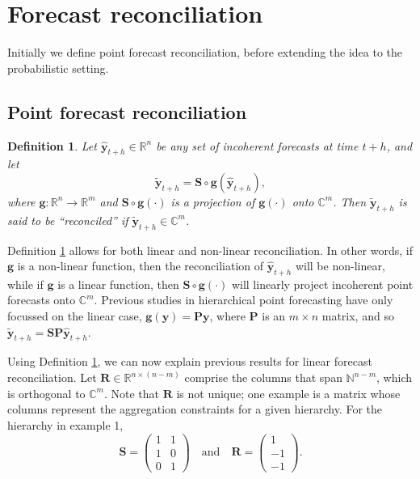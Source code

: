 \documentclass[a4paper, 11pt]{article}
\newtheorem{definition}{Definition}[section]
\begin{document}
\section{Forecast reconciliation}\label{sec:reconciliation}

Initially we define point forecast reconciliation, before extending the idea to the probabilistic setting.

\subsection{Point forecast reconciliation}


\begin{definition}\label{def:reconpoint}
  Let $\hat{\bm{y}}_{t+h} \in \mathbb{R}^n$ be any set of incoherent forecasts at time $t+h$, and let 
  \begin{equation}
    \tilde{\bm{y}}_{t+h}=\bm{S} \circ \bm{g}(\hat{\bm{y}}_{t+h}),
  \end{equation} 
  where $\bm{g}:\mathbb{R}^n \rightarrow \mathbb{R}^m$ and $\bm{S}\circ \bm{g}(\cdot)$ is a projection of $\bm{g}(\cdot)$ onto $\mathbb{C}^m$. Then $\tilde{\bm{y}}_{t+h}$ is said to be ``reconciled'' if  $\tilde{\bm{y}}_{t+h} \in \mathbb{C}^m$.
\end{definition}

Definition \ref{def:reconpoint} allows for both linear and non-linear reconciliation. In other words, if $\bm{g}$ is a non-linear function, then the reconciliation of $\hat{\bm{y}}_{t+h}$ will be non-linear, while if $\bm{g}$ is a linear function, then $\bm{S}\circ \bm{g}(\cdot)$ will linearly project incoherent point forecasts onto $\mathbb{C}^m$. Previous studies in hierarchical point forecasting have only focussed on the linear case, $\bm{g}(\bm{y}) = \bm{P}\bm{y}$, where $\bm{P}$ is an $m \times n$ matrix, and so $\tilde{\bm{y}}_{t+h}=\bm{S}\bm{P} \hat{\bm{y}}_{t+h}$. 

Using Definition \ref{def:reconpoint}, we can now explain previous results for linear forecast reconciliation. Let $\bm{R} \in \mathbb{R}^{n \times (n-m)}$ comprise the columns that span $\bm{\mathbb{N}}^{n-m}$, which is orthogonal to $\mathbb{C}^m$. Note that $\bm{R}$ is not unique; one example is a matrix whose columns represent the aggregation constraints for a given hierarchy. For the hierarchy in example 1, 
$$ 
\bm{S} = 
\begin{pmatrix} 
1& 1 \\ 1 & 0 \\ 0&1 
\end{pmatrix} 
\quad \text{and} \quad 
\bm{R} = 
\begin{pmatrix}  
1 \\ -1 \\ -1 
\end{pmatrix}.
$$ 
\end{document}
